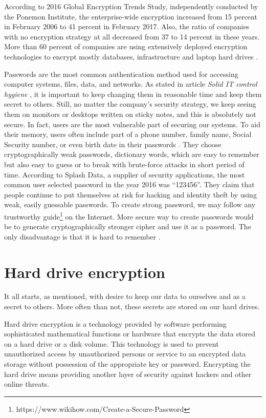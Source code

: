 According to 2016 Global Encryption Trends Study, independently conducted by the Ponemon Institute, the enterprise-wide encryption increased from 15 percent in February 2006 to 41 percent in February 2017.
Also, the ratio of companies with no encryption strategy at all decreased from 37 to 14 percent in these years.
More than 60 percent of companies are using extensively deployed encryption technologies to encrypt mostly databases, infrastructure and laptop hard drives \cite{Thales}.

Passwords are the most common authentication method used for accessing computer systems, files, data, and networks.
As stated in article {\it Solid IT control hygiene} \cite{Perry2017}\label{rotation}, it is important to keep changing them in reasonable time and keep them secret to others.
Still, no matter the company's security strategy, we keep seeing them on monitors or desktops written on sticky notes, and this is absolutely not secure.
In fact, users are the most vulnerable part of securing our systems.
To aid their memory, users often include part of a phone number, family name, Social Security number, or even birth date in their passwords \cite{pwdsec}.
They choose cryptographically weak passwords, dictionary words, which are easy to remember but also easy to guess or to break with brute-force attacks in short period of time.
According to Splash Data, a supplier of security applications, the most common user selected password in the year 2016 was “123456”.
They claim that people continue to put themselves at risk for hacking and identity theft by using weak, easily guessable passwords.
To create strong password, we may follow any trustworthy guide\footnote{https://www.wikihow.com/Create-a-Secure-Password} on the Internet.
More secure way to create passwords would be to generate cryptographically stronger cipher and use it as a password.
The only disadvantage is that it is hard to remember \cite{splashdata}.



\section{Hard drive encryption}

It all starts, as mentioned, with desire to keep our data to ourselves and as a secret to others.
More often than not, these secrets are stored on our hard drives.

Hard drive encryption is a technology provided by software performing sophisticated mathematical functions or hardware that encrypts the data stored on a hard drive or a disk volume.
This technology is used to prevent unauthorized access by unauthorized persons or service to an encrypted data storage without possession of the appropriate key or password.
Encrypting the hard drive means providing another layer of security against hackers and other online threats.

